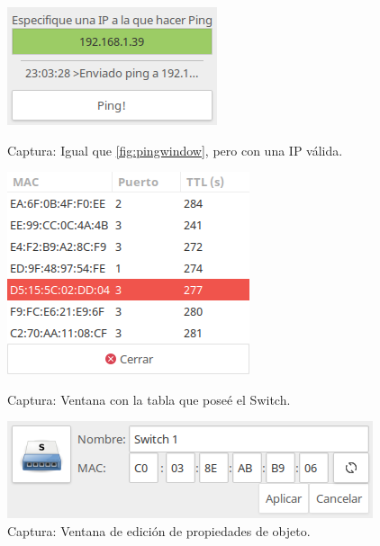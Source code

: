 \documentclass[a4paper, 11pt]{report} %
\begin{document}
\begin{figure}[H]
\vspace*{1cm}
\centering
\begin{minipage}[t]{0.4\textwidth}
	\centering
	\includegraphics[width=\textwidth]{Resources/Screenshots/2016-09-12-230329_233x131_scrot.png}
	\caption{Captura: Igual que \ref{fig:pingwindow}, pero con una IP válida.}
	\label{fig:pingwindow2}
\end{minipage}
\hspace*{0.15\textwidth}
\begin{minipage}[t]{0.4\textwidth}
	\centering
	\includegraphics[scale=0.6]{Resources/Screenshots/2016-09-12-230428_269x225_scrot.png}
	\caption{Captura: Ventana con la tabla que poseé el Switch.}
	\label{fig:switchingtable}
\end{minipage}

\vspace*{1cm}
\centering
\begin{minipage}[t]{0.5\textwidth}
	\centering
	\includegraphics[scale=0.6]{Resources/Screenshots/2016-09-13-200254_406x108_scrot.png}
	\caption{Captura: Ventana de edición de propiedades de objeto.}
	\label{fig:editwindow}
\end{minipage}

\end{figure}
\end{document}
